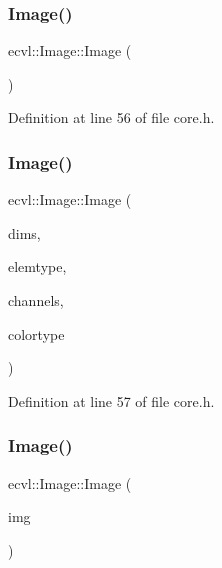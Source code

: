 \subsubsection{Image()\hspace{0.1cm}{\footnotesize\ttfamily [1/4]}}
{\footnotesize\ttfamily ecvl\+::\+Image\+::\+Image (\begin{DoxyParamCaption}{ }\end{DoxyParamCaption})\hspace{0.3cm}{\ttfamily [inline]}}



Definition at line 56 of file core.\+h.

\mbox{\label{classecvl_1_1_image_a6f2bb7cc6e702a7f5dfadbfe26a84bc9}} 
\subsubsection{Image()\hspace{0.1cm}{\footnotesize\ttfamily [2/4]}}
{\footnotesize\ttfamily ecvl\+::\+Image\+::\+Image (\begin{DoxyParamCaption}\item[{std\+::initializer\+\_\+list$<$ int $>$}]{dims,  }\item[{\textbf{ Data\+Type}}]{elemtype,  }\item[{std\+::string}]{channels,  }\item[{\textbf{ Color\+Type}}]{colortype }\end{DoxyParamCaption})\hspace{0.3cm}{\ttfamily [inline]}}



Definition at line 57 of file core.\+h.

\mbox{\label{classecvl_1_1_image_aca14b15a1e6bdbdceedad190b222fda4}} 
\subsubsection{Image()\hspace{0.1cm}{\footnotesize\ttfamily [3/4]}}
{\footnotesize\ttfamily ecvl\+::\+Image\+::\+Image (\begin{DoxyParamCaption}\item[{const \textbf{ Image} \&}]{img }\end{DoxyParamCaption})\hspace{0.3cm}{\ttfamily [inline]}}



